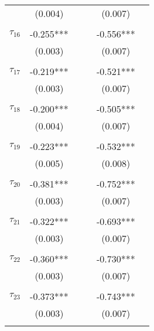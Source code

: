 \begin{tabular}{@{\extracolsep{-2pt}}lccccc}
            &  (0.004)  &&      &  (0.007)  &          \\
            &           &&      &           &          \\[-2.1ex]
$\tau_{16}$ & -0.255*** &&      & -0.556*** &          \\
            &  (0.003)  &&      &  (0.007)  &          \\
            &           &&      &           &          \\[-2.1ex]
$\tau_{17}$ & -0.219*** &&      & -0.521*** &          \\
            &  (0.003)  &&      &  (0.007)  &          \\
            &           &&      &           &          \\[-2.1ex]
$\tau_{18}$ & -0.200*** &&      & -0.505*** &          \\
            &  (0.004)  &&      &  (0.007)  &          \\
            &           &&      &           &          \\[-2.1ex]
$\tau_{19}$ & -0.223*** &&      & -0.532*** &          \\
            &  (0.005)  &&      &  (0.008)  &          \\
            &           &&      &           &          \\[-2.1ex]
$\tau_{20}$ & -0.381*** &&      & -0.752*** &          \\
            &  (0.003)  &&      &  (0.007)  &          \\
            &           &&      &           &          \\[-2.1ex]
$\tau_{21}$ & -0.322*** &&      & -0.693*** &          \\
            &  (0.003)  &&      &  (0.007)  &          \\
            &           &&      &           &          \\[-2.1ex]
$\tau_{22}$ & -0.360*** &&      & -0.730*** &          \\
            &  (0.003)  &&      &  (0.007)  &          \\
            &           &&      &           &          \\[-2.1ex]
$\tau_{23}$ & -0.373*** &&      & -0.743*** &          \\
            &  (0.003)  &&      &  (0.007)  &          \\
            &           &&      &           &          \\[-2.1ex]

\end{tabular}
